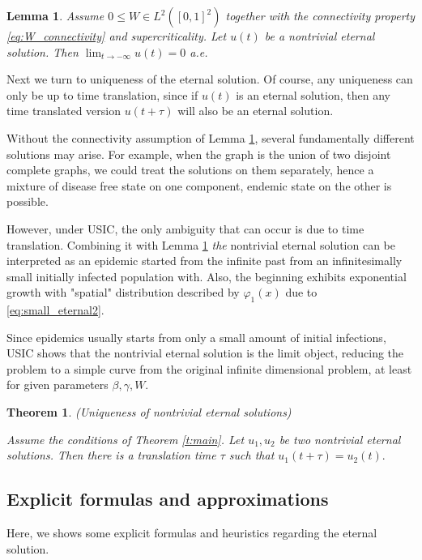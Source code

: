 \documentclass{article}
\newcommand{\1}[1]{{\mathds{1}}_{\left\{#1\right\}}}
\newtheorem{theorem}{Theorem}
\newtheorem{lemma}{Lemma}
\begin{document}
\begin{lemma}
\label{l:convergene_to_0}
Assume $0 \leq W \in L^2([0,1]^2)$ together with the connectivity property \eqref{eq:W_connectivity} and supercriticality. Let $u(t)$ be a nontrivial eternal solution. Then $\lim_{t \to -\infty}u(t)=0$ a.e.
\end{lemma}

Next we turn to uniqueness of the eternal solution. Of course, any uniqueness can only be up to time translation, since if $u(t)$ is an eternal solution, then any time translated version $u(t+\tau)$ will also be an eternal solution.

Without the connectivity assumption of Lemma \ref{l:convergene_to_0}, several fundamentally different solutions may arise. For example, when the graph is the union of two disjoint complete graphs, we could treat the solutions on them separately, hence a mixture of disease free state on one component, endemic state on the other is possible.

However, under USIC, the only ambiguity that can occur is due to time translation. Combining it with Lemma \ref{l:convergene_to_0} \emph{the} nontrivial eternal solution can be interpreted as an epidemic started from the infinite past from an infinitesimally small initially infected population with. Also, the beginning exhibits exponential growth with "spatial" distribution described by $\varphi_1(x)$ due to \eqref{eq:small_eternal2}.

Since epidemics usually starts from only a small amount of initial infections, USIC shows that the nontrivial eternal solution is the limit object, reducing the problem to a simple curve from the original infinite dimensional problem, at least for given parameters $\beta,\gamma,W$.

\begin{theorem}(Uniqueness of nontrivial eternal solutions)
\label{t:uniqunes}

Assume the conditions of Theorem \ref{t:main}. Let $u_1,u_2$ be two nontrivial eternal solutions. Then there is a translation time $\tau$ such that $u_1(t+\tau)=u_2(t).$
\end{theorem}

\subsection{Explicit formulas and approximations}

Here, we shows some explicit formulas and heuristics regarding the eternal solution.
\end{document}
